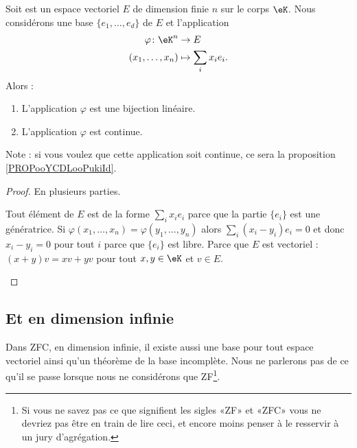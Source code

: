 \begin{proposition}	\label{PROPooOMUHooYFXJSY}
	Soit est un espace vectoriel \( E\) de dimension finie \( n\) sur le corps \( \eK\). Nous considérons une base \( \{ e_1,\ldots,e_d \}\) de \( E\) et l'application
	\begin{equation}
		\begin{aligned}
			\varphi\colon \eK^n & \to E                 \\
			(x_1,\ldots,x_n)    & \mapsto \sum_ix_ie_i.
		\end{aligned}
	\end{equation}
	Alors :
	\begin{enumerate}
		\item
		      L'application \( \varphi\) est une bijection linéaire.
		\item
		      L'application \( \varphi\) est continue.
	\end{enumerate}
	Note : si vous voulez que cette application soit continue, ce sera la proposition \ref{PROPooYCDLooPukiId}.
\end{proposition}

\begin{proof}
	En plusieurs parties.
	\begin{subproof}
		\spitem[Surjective]
		Tout élément de \( E\) est de la forme \( \sum_ix_ie_i\) parce que la partie \( \{ e_i \}\) est une génératrice.
		\spitem[Injective]
		Si \( \varphi(x_1,\ldots,x_n)=\varphi(y_1,\ldots,y_n)\) alors \( \sum_i(x_i-y_i)e_i=0\) et donc \( x_i-y_i=0\) pour tout \( i\) parce que \( \{ e_i \}\) est libre.
		\spitem[Linéaire]
		Parce que \( E\) est vectoriel : \( (x+y)v=xv+yv\) pour tout \( x,y\in \eK\) et \( v\in E\).
	\end{subproof}
\end{proof}


\subsection{Et en dimension infinie}

Dans ZFC, en dimension infinie, il existe aussi une base pour tout espace vectoriel ainsi qu'un théorème de la base incomplète. Nous ne parlerons pas de ce qu'il se passe lorsque nous ne considérons que ZF\footnote{Si vous ne savez pas ce que signifient les sigles «ZF» et «ZFC» vous ne devriez pas être en train de lire ceci, et encore moins penser à le resservir à un jury d'agrégation.}.

